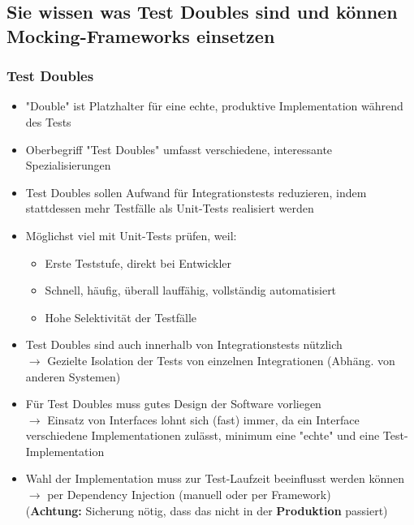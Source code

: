 \documentclass[a4paper]{article}
\begin{document}
		\subsection{Sie wissen was Test Doubles sind und können Mocking-Frameworks einsetzen}
		
			\subsubsection{Test Doubles}
			
			\begin{itemize}
				\item "Double" ist Platzhalter für eine echte, produktive Implementation während des Tests
				\item Oberbegriff "Test Doubles" umfasst verschiedene, interessante Spezialisierungen
				\item Test Doubles sollen Aufwand für Integrationstests reduzieren, indem stattdessen mehr Testfälle als Unit-Tests realisiert werden
				\item Möglichst viel mit Unit-Tests prüfen, weil:
					\begin{itemize}
						\item Erste Teststufe, direkt bei Entwickler
						\item Schnell, häufig, überall lauffähig, vollständig automatisiert
						\item Hohe Selektivität der Testfälle
					\end{itemize}
				\item Test Doubles sind auch innerhalb von Integrationstests nützlich\\
					$\rightarrow$ Gezielte Isolation der Tests von einzelnen Integrationen (Abhäng. von anderen Systemen)
				\item Für Test Doubles muss gutes Design der Software vorliegen\\
					$\rightarrow$ Einsatz von Interfaces lohnt sich (fast) immer, da ein Interface verschiedene Implementationen zulässt, minimum eine "echte" und eine Test-Implementation
				\item Wahl der Implementation muss zur Test-Laufzeit beeinflusst werden können\\
					$\rightarrow$ per Dependency Injection (manuell oder per Framework)\\
					(\textbf{Achtung:} Sicherung nötig, dass das nicht in der \textbf{Produktion} passiert)
			\end{itemize}
		
		\newpage
		
\end{document}
